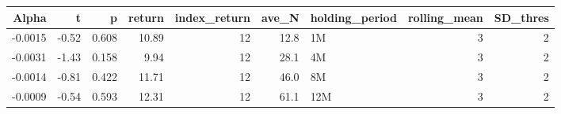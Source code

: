\begin{table}[ht]
\centering
\begin{tabular}{rrrrrrlrr}
  \hline
Alpha & t & p & return & index\_return & ave\_N & holding\_period & rolling\_mean & SD\_thres \\ 
  \hline
-0.0015 & -0.52 & 0.608 & 10.89 & 12 & 12.8 & 1M &  3 &  2 \\ 
  -0.0031 & -1.43 & 0.158 & 9.94 & 12 & 28.1 & 4M &  3 &  2 \\ 
  -0.0014 & -0.81 & 0.422 & 11.71 & 12 & 46.0 & 8M &  3 &  2 \\ 
  -0.0009 & -0.54 & 0.593 & 12.31 & 12 & 61.1 & 12M &  3 &  2 \\ 
   \hline
\end{tabular}
\end{table}

